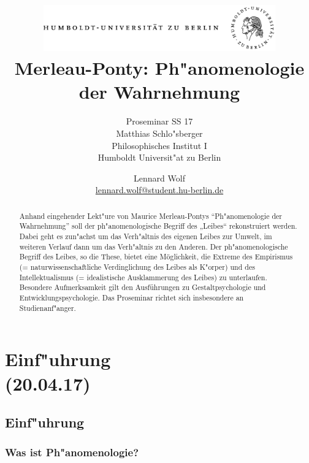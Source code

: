 \documentclass[emulatestandardclasses]{scrartcl}
\date{\vspace{-3ex}}
\begin{document}
\title{
	\includegraphics*[width=0.75\textwidth]{ErstesSem/images/hu_logo.png}\\
	\vspace{24pt}
	Merleau-Ponty: Ph"anomenologie der Wahrnehmung}
\subtitle{Proseminar SS 17\\
          Matthias Schlo"sberger\\
          Philosophisches Institut I \\ 
          Humboldt Universit"at zu Berlin}
\author{Lennard Wolf\\
        \small{\href{mailto:lennard.wolf@student.hu-berlin.de}{lennard.wolf@student.hu-berlin.de}}}
\maketitle
\begin{abstract}

Anhand eingehender Lekt"ure von Maurice Merleau-Pontys "`Ph"anomenologie der Wahrnehmung"' soll der ph"anomenologische Begriff des „Leibes“ rekonstruiert werden. Dabei geht es zun"achst um das Verh"altnis des eigenen Leibes zur Umwelt, im weiteren Verlauf dann um das Verh"altnis zu den Anderen. Der ph"anomenologische Begriff des Leibes, so die These, bietet eine Möglichkeit, die Extreme des Empirismus (= naturwissenschaftliche Verdinglichung des Leibes als K"orper) und des Intellektualismus (= idealistische Ausklammerung des Leibes) zu unterlaufen. Besondere Aufmerksamkeit gilt den Ausführungen zu Gestaltpsychologie und Entwicklungspsychologie. Das Proseminar richtet sich insbesondere an Studienanf"anger.

\end{abstract}
\newpage

\tableofcontents
\listoffigures
\newpage


\section{Einf"uhrung\\(20.04.17)}

\subsection{Einf"uhrung}
\subsubsection{Was ist Ph"anomenologie?}
\end{document}
